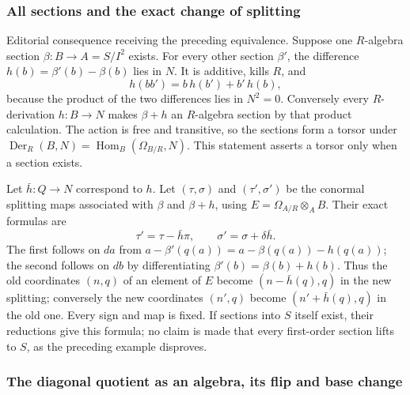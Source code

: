 \subsubsection{All sections and the exact change of splitting}\label{algebra-proof-041-all-sections-and-the-exact-change-of-splitting}

Editorial consequence receiving the preceding equivalence. Suppose one \(R\)-algebra section \(\beta:B\to A=S/I^2\) exists. For every other section \(\beta'\), the difference \(h(b)=\beta'(b)-\beta(b)\) lies in \(N\). It is additive, kills \(R\), and \[
h(bb')=b\,h(b')+b'\,h(b),
\] because the product of the two differences lies in \(N^2=0\). Conversely every \(R\)-derivation \(h:B\to N\) makes \(\beta+h\) an \(R\)-algebra section by that product calculation. The action is free and transitive, so the sections form a torsor under \(\operatorname{Der}_R(B,N)=\operatorname{Hom}_B(\Omega_{B/R},N)\). This statement asserts a torsor only when a section exists.

Let \(\bar h:Q\to N\) correspond to \(h\). Let \((\tau,\sigma)\) and \((\tau',\sigma')\) be the conormal splitting maps associated with \(\beta\) and \(\beta+h\), using \(E=\Omega_{A/R}\otimes_A B\). Their exact formulas are \[
\tau'=\tau-\bar h\pi,\qquad
\sigma'=\sigma+\delta\bar h.
\] The first follows on \(da\) from \(a-\beta'(q(a))=a-\beta(q(a))-h(q(a))\); the second follows on \(db\) by differentiating \(\beta'(b)=\beta(b)+h(b)\). Thus the old coordinates \((n,q)\) of an element of \(E\) become \((n-\bar h(q),q)\) in the new splitting; conversely the new coordinates \((n',q)\) become \((n'+\bar h(q),q)\) in the old one. Every sign and map is fixed. If sections into \(S\) itself exist, their reductions give this formula; no claim is made that every first-order section lifts to \(S\), as the preceding example disproves.

\subsubsection{The diagonal quotient as an algebra, its flip and base change}\label{algebra-proof-041-the-diagonal-quotient-as-an-algebra-its-flip-and-base-change}

